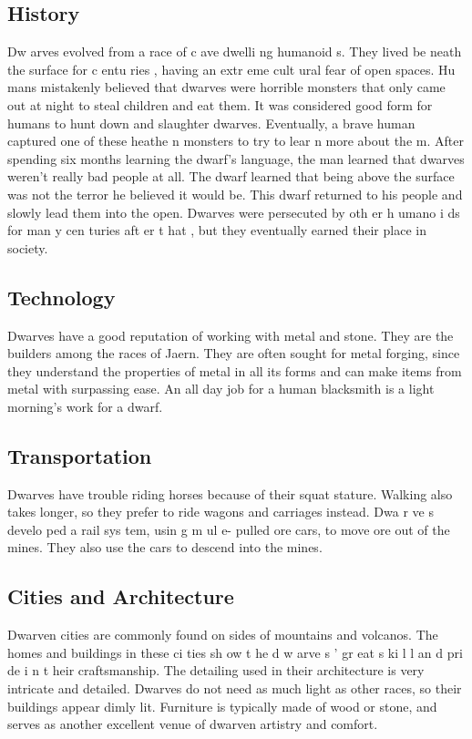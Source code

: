 \begin{multicols*}{2}
\subsection{History}
Dw arves evolved from a race of c ave dwelli ng
humanoid s. They lived be neath the surface for c entu ries ,
having an extr eme cult ural fear of open spaces. Hu mans
mistakenly believed that dwarves were horrible monsters that
only came out at night to steal children and eat them. It was
considered good form for humans to hunt down and slaughter
dwarves.
Eventually, a brave human captured one of these
heathe n monsters to try to lear n more about the m. After
spending six months learning the dwarf’s language, the man
learned that dwarves weren’t really bad people at all. The
dwarf learned that being above the surface was not the terror
he believed it would be. This dwarf returned to his people and
slowly lead them into the open. Dwarves were persecuted by
oth er h umano i ds for man y cen turies aft er t hat , but they
eventually earned their place in society.
\subsection{Technology}
Dwarves have a good reputation of working with
metal and stone. They are the builders among the races of
Jaern. They are often sought for metal forging, since they
understand the properties of metal in all its forms and can
make items from metal with surpassing ease. An all day job
for a human blacksmith is a light morning’s work for a dwarf.
\subsection{Transportation}
Dwarves have trouble riding horses because of their
squat stature. Walking also takes longer, so they prefer to ride
wagons and carriages instead.
Dwa r ve s develo ped a rail sys tem, usin g m ul e-
pulled ore cars, to move ore out of the mines. They also use
the cars to descend into the mines.
\subsection{Cities and Architecture}
Dwarven cities are commonly found on sides of
mountains and volcanos. The homes and buildings in these
ci ties sh ow t he d w arve s ’ gr eat s ki l l an d pri de i n t heir
craftsmanship. The detailing used in their architecture is very
intricate and detailed. Dwarves do not need as much light as
other races, so their buildings appear dimly lit.
Furniture is typically made of wood or stone, and
serves as another excellent venue of dwarven artistry and
comfort.

\end{multicols*}
